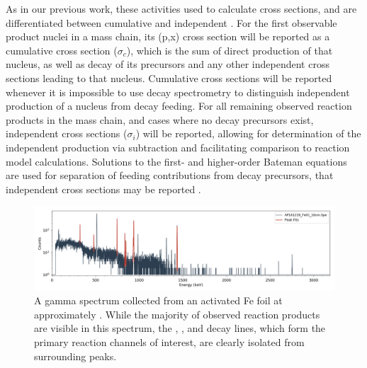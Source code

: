 As in our previous work, these activities used to calculate cross sections, and are differentiated between cumulative and independent \cite{Voyles2018a}.
For the first observable product nuclei in a mass chain, its (p,x) cross section will be reported as a cumulative cross section ($\sigma_c$), which is the sum of direct production of that nucleus, as well as decay of its  precursors and any other independent cross sections leading to that nucleus. 
Cumulative cross sections will be reported whenever it is impossible to use decay spectrometry to distinguish independent production of a nucleus from decay feeding.
For all remaining observed reaction products in the mass chain, and cases where no decay precursors exist, independent cross sections ($\sigma_i$) will be reported, allowing for determination of the independent production via subtraction  and facilitating comparison to reaction model calculations.  
Solutions to the first- and higher-order  Bateman equations are used for separation of  feeding contributions from decay precursors, that  independent cross sections may be reported \cite{bateman1910solution,Cetnar2006}.



\begin{figure}
 \centering
 \includegraphics[width=6in]{./figures/AP161219_Fe01_10cm.png}
 \caption{  A gamma spectrum collected from an activated Fe foil at approximately . While the majority of observed reaction products are visible in this spectrum,  the , , and  decay lines, which form the   primary reaction channels of interest, are  clearly isolated from surrounding peaks.}
 \label{fig:gspec_femn}
\end{figure}



